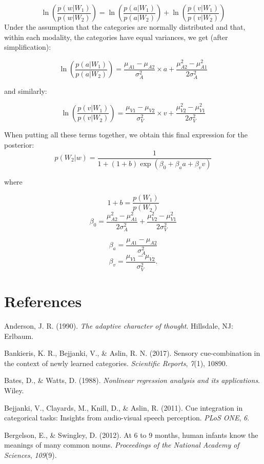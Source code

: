 \documentclass[english,,man,floatsintext]{apa6}
\theoremstyle{definition}
\theoremstyle{definition}
\theoremstyle{definition}
\theoremstyle{remark}
\begin{document}
\[ \ln(\frac{p(w |W_1)}{p(w|W_2)})=\ln(\frac{p(a|W_1)}{p(a|W_2)})+\ln(\frac{p(v|W_1)}{p(v|W_2)}) \]
Under the assumption that the categories are normally distributed and
that, within each modality, the categories have equal variances, we get
(after simplification):

\[\ln(\frac{p(a|W_1)}{p(a|W_2)})=\frac{\mu_{A1}-\mu_{A2}}{\sigma^2_{A}}\times a+ \frac{\mu^2_{A2}-\mu^2_{A1}}{2\sigma^2_{A}}\]

and similarly:

\[\ln(\frac{p(v|W_1)}{p(v|W_2)})=\frac{\mu_{V1}-\mu_{V2}}{\sigma^2_{V}}\times v+ \frac{\mu^2_{V2}-\mu^2_{V1}}{2\sigma^2_{V}}\]

When putting all these terms together, we obtain this final expression
for the posterior:
\[p(W_2 | w)=\frac{1}{1+(1+b)\exp(\beta_0+\beta_aa+\beta_vv)}\]

where

\[1+b=\frac{p(W_1)}{p(W_2)}\]
\[\beta_0=\frac{\mu^2_{A2}-\mu^2_{A1}}{2\sigma^2_{A}}+\frac{\mu^2_{V2}-\mu^2_{V1}}{2\sigma^2_{V}}\]

\[\beta_a=\frac{\mu_{A1}-\mu_{A2}}{\sigma^2_{A}}\]
\[\beta_v=\frac{\mu_{V1}-\mu_{V2}}{\sigma^2_{V}}.\]

\section{References}\label{references}

\setlength{\parindent}{-0.5in} \setlength{\leftskip}{0.5in}

\hypertarget{refs}{}
\hypertarget{ref-anderson90}{}
Anderson, J. R. (1990). \emph{The adaptive character of thought}.
Hillsdale, NJ: Erlbaum.

\hypertarget{ref-Bankieris17}{}
Bankieris, K. R., Bejjanki, V., \& Aslin, R. N. (2017). Sensory
cue-combination in the context of newly learned categories.
\emph{Scientific Reports}, \emph{7}(1), 10890.

\hypertarget{ref-bates88}{}
Bates, D., \& Watts, D. (1988). \emph{Nonlinear regression analysis and
its applications}. Wiley.

\hypertarget{ref-bejjanki2011}{}
Bejjanki, V., Clayards, M., Knill, D., \& Aslin, R. (2011). Cue
integration in categorical tasks: Insights from audio-visual speech
perception. \emph{PLoS ONE}, \emph{6}.

\hypertarget{ref-bergelson2012}{}
Bergelson, E., \& Swingley, D. (2012). At 6 to 9 months, human infants
know the meanings of many common nouns. \emph{Proceedings of the
National Academy of Sciences}, \emph{109}(9).
\end{document}
